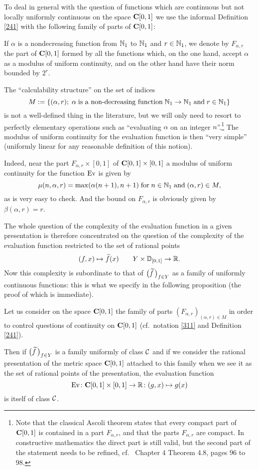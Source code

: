 \noindent 
To deal in general with the question of functions which are continuous but not locally uniformly continuous on the space ${{\bf C}[0,1]}$ we use the informal Definition \ref{241} with the following family of parts of ${{\bf C}[0,1]}$: 

\begin{notation} \label{311}
If $\alpha$ is a nondecreasing function from $\mathbb {N}_1$ to $\mathbb {N}_1$ and $r \in \mathbb {N}_1$, we denote by $F_{\alpha,r}$ the part of ${{\bf C}[0,1]}$ formed by all the functions which, on the one hand, accept $\alpha$ as a modulus of uniform continuity, and on the other hand have their norm bounded by $2^r$.
\end{notation}

The ``calculability structure'' on the set of indices 
\[
M := \{(\alpha,r); \; \alpha \; \hbox{is a non-decreasing function} \; \mathbb {N}_1\to\mathbb {N}_1 \;{\rm and}\;r\in\mathbb {N}_1\}
\]
is not a well-defined thing in the literature, but we will only need to resort to perfectly elementary operations such as ``evaluating $\alpha$ on an integer $n$''.\footnote{Note that the classical Ascoli theorem states that every compact part of ${{\bf C}[0,1]}$ is contained in a part $F_{\alpha,r}$, and that the parts $F_{\alpha,r}$ are compact. In constructive mathematics the direct part is still valid, but the second part of the statement needs to be refined, cf.\ \cite{BB} Chapter 4 Theorem 4.8, pages 96 to 98.}
The modulus of uniform continuity for the evaluation function is then ``very simple'' (uniformly linear for any reasonable definition of this notion).

\noindent 
Indeed, near the part $F_{\alpha , r} \times [0,1]$ of ${{\bf C}[0,1]} \times [0,1]$ a modulus of uniform continuity for the function ${\rm Ev}$ is given by 
\[
\mu(n,\alpha,r) = \max (\alpha(n+1),n+1) \; {\rm for} \; n \in \mathbb {N}_1 \; {\rm and} \; (\alpha,r) \in M,
\] 
as is very easy to check. And the bound on $F_{\alpha ,r}$ is obviously given by $\beta(\alpha,r) = r$.

\noindent 
The whole question of the complexity of the evaluation function in a given presentation is therefore concentrated on the question of the complexity of the evaluation function restricted to the set of rational points 
\[
(f,x) \mapsto \widetilde{f}(x)\qquad  Y \times \mathbb {D}_{[0,1]} \to \mathbb {R}.
\]
Now this complexity is subordinate to that of $\big(\widetilde{f}\,\big)_{f \in Y}$ as a family of uniformly continuous functions: this is what we specify in the following proposition (the proof of which is immediate).

\begin{proposition} \label{312}
Let us consider on the space ${{\bf C}[0,1]}$ the family of parts $(F_{\alpha,r})_{(\alpha,r) \in M}$ in order to control questions of continuity on ${{\bf C}[0,1]}$ (cf.\ notation \ref{311} and Definition \ref{241}).

\noindent 
Then if $\big(\widetilde{f}\,\big)_{f \in Y}$ is a family uniformly of class ${{\cal C}}$ and if we consider the rational presentation of the metric space ${{\bf C}[0,1]}$ attached to this  family when we see it as the set of rational points of the presentation, the evaluation function 
\[
{\rm Ev}\colon {{\bf C}[0,1]} \times [0,1] \to \mathbb {R}\colon (g,x) \mapsto g(x)
\]
is itself of class ${{\cal C}}$.
\end{proposition}

